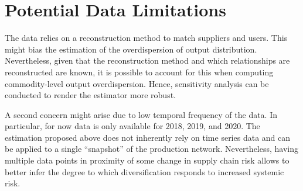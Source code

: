 \documentclass[american, abstract=on]{scrartcl}
\begin{document}
\section{Potential Data Limitations}

The data relies on a reconstruction method to match suppliers and users. This might bias the estimation of the overdispersion of output distribution. Nevertheless, given that the reconstruction method and which relationships are reconstructed are known, it is possible to account for this when computing commodity-level output overdispersion. Hence, sensitivity analysis can be conducted to render the estimator more robust.

A second concern might arise due to low temporal frequency of the data. In particular, for now data is only available for 2018, 2019, and 2020. The estimation proposed above does not inherently rely on time series data and can be applied to a single ``snapshot'' of the production network. Nevertheless, having multiple data points in proximity of some change in supply chain risk allows to better infer the degree to which diversification responds to increased systemic risk.

\newpage
\printbibliography
\end{document}
